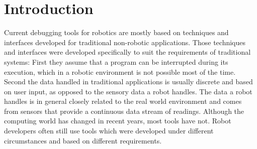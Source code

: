 \chapter{Introduction}


Current debugging tools for robotics are mostly based on techniques and interfaces developed for traditional non-robotic applications. Those techniques and interfaces were developed specifically to suit the requirements of traditional systems: First they assume that a program can be interrupted during its execution, which in a robotic environment is not possible most of the time. Second the data handled in traditional applications is usually discrete and based on user input, as opposed to the sensory data a robot handles. The data a robot handles is in general closely related to the real world environment and comes from sensors that provide a continuous data stream of readings. Although the computing world has changed in recent years, most tools have not. Robot developers often still use tools which were developed under different circumstances and based on different requirements.

